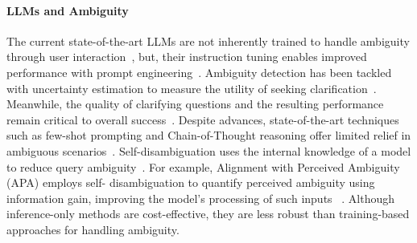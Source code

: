 \paragraph{LLMs and Ambiguity}
The current state-of-the-art LLMs
are not inherently trained to handle ambiguity through
user interaction~\cite{zhang2024clamberbenchmarkidentifyingclarifying}, but, their instruction
tuning enables improved performance with prompt engineering~\cite{white2023prompt}. Ambiguity detection has been
tackled with uncertainty estimation to measure the utility
of seeking clarification~\cite{zhang2023clarifynecessaryresolvingambiguity, park2024claraclassifyingdisambiguatinguser}. Meanwhile, the quality of clarifying questions and
the resulting performance remain critical to overall success~\cite{learning-good-questions, clarifydelphi, kuhn2023clamselectiveclarificationambiguous}. Despite advances, state-of-the-art techniques such as few-shot prompting and Chain-of-Thought
reasoning offer limited relief in ambiguous scenarios~\cite{zhang2024clamberbenchmarkidentifyingclarifying}. Self-disambiguation uses the internal knowledge of a
model to reduce query ambiguity~\cite{keluskar2024llmsunderstandambiguitytext,sterner2022explaining,sumanathilaka2024llmsassistambiguityquantitative}. For example,
Alignment with Perceived Ambiguity (APA) employs self-
disambiguation to quantify perceived ambiguity using information gain, improving the model’s processing of such
inputs ~\cite{kim2024aligninglanguagemodelsexplicitly}. Although inference-only
methods are cost-effective, they are less robust than training-based approaches for handling ambiguity.
